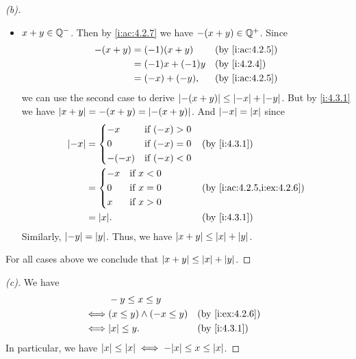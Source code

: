 \begin{proof}[(b)]
\begin{itemize}
\begin{itemize}
          \end{itemize}
    \item \(x + y \in \mathbb{Q}^-\).
          Then by \cref{i:ac:4.2.7} we have \(-(x + y) \in \mathbb{Q}^+\).
          Since
          \begin{align*}
            -(x + y) & = (-1) (x + y)    &  & \by{i:ac:4.2.5} \\
                     & = (-1) x + (-1) y &  & \by{i:4.2.4}    \\
                     & = (-x) + (-y),    &  & \by{i:ac:4.2.5}
          \end{align*}
          we can use the second case to derive \(\left\lvert-(x + y)\right\rvert \leq \left\lvert-x\right\rvert + \left\lvert-y\right\rvert\).
          But by \cref{i:4.3.1} we have \(\left\lvert x + y\right\rvert = -(x + y) = \left\lvert-(x + y)\right\rvert\).
          And \(\left\lvert-x\right\rvert = \left\lvert x\right\rvert\) since
          \begin{align*}
            \abs{-x} & = \begin{dcases}
                           -x    & \text{if } (-x) > 0 \\
                           0     & \text{if } (-x) = 0 \\
                           -(-x) & \text{if } (-x) < 0
                         \end{dcases} &  & \by{i:4.3.1}                     \\
                     & = \begin{dcases}
                           -x & \text{if } x < 0 \\
                           0  & \text{if } x = 0 \\
                           x  & \text{if } x > 0
                         \end{dcases}       &  & \by{i:ac:4.2.5,i:ex:4.2.6} \\
                     & = \abs{x}.                     &  & \by{i:4.3.1}
          \end{align*}
          Similarly, \(\left\lvert-y\right\rvert = \left\lvert y\right\rvert\).
          Thus, we have \(\left\lvert x + y\right\rvert \leq \left\lvert x\right\rvert + \left\lvert y\right\rvert\).
  \end{itemize}
  For all cases above we conclude that \(\left\lvert x + y\right\rvert \leq \left\lvert x\right\rvert + \left\lvert y\right\rvert\).
\end{proof}

\begin{proof}[(c)]
  We have
  \begin{align*}
         & -y \leq x \leq y                                  \\
    \iff & (x \leq y) \land (-x \leq y) &  & \by{i:ex:4.2.6} \\
    \iff & \abs{x} \leq y.              &  & \by{i:4.3.1}
  \end{align*}
  In particular, we have \(\abs{x} \leq \abs{x} \iff -\abs{x} \leq x \leq \abs{x}\).
\end{proof}

